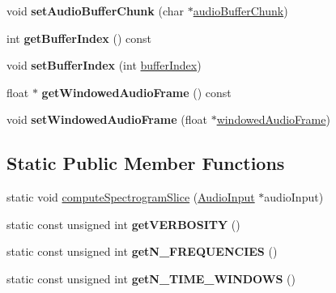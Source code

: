\begin{DoxyCompactItemize}
\hypertarget{classAudioInput_a2534ecbcf1513408cabf8d85c8c8dc46}{}\label{classAudioInput_a2534ecbcf1513408cabf8d85c8c8dc46} 
void {\bfseries set\+Audio\+Buffer\+Chunk} (char $\ast$\hyperlink{classAudioInput_ab1f2b0fc5ee061ab92c045d2325c8ab7}{audio\+Buffer\+Chunk})
\item 
\hypertarget{classAudioInput_a78df439ada22ba00be19c4c8a82bbe3d}{}\label{classAudioInput_a78df439ada22ba00be19c4c8a82bbe3d} 
int {\bfseries get\+Buffer\+Index} () const
\item 
\hypertarget{classAudioInput_a506d7f5eec641d0232286ea145270038}{}\label{classAudioInput_a506d7f5eec641d0232286ea145270038} 
void {\bfseries set\+Buffer\+Index} (int \hyperlink{classAudioInput_a3c9888a90ca8bc6b42257f3f11ee9a6e}{buffer\+Index})
\item 
\hypertarget{classAudioInput_a4de4a846fe48603932495acaafc54449}{}\label{classAudioInput_a4de4a846fe48603932495acaafc54449} 
float $\ast$ {\bfseries get\+Windowed\+Audio\+Frame} () const
\item 
\hypertarget{classAudioInput_a8e7dd67ab635c3935bd54f72a5282dce}{}\label{classAudioInput_a8e7dd67ab635c3935bd54f72a5282dce} 
void {\bfseries set\+Windowed\+Audio\+Frame} (float $\ast$\hyperlink{classAudioInput_ae5a196a9ba111b7aa1ef64db6f092432}{windowed\+Audio\+Frame})
\end{DoxyCompactItemize}
\subsection*{Static Public Member Functions}
\begin{DoxyCompactItemize}
\item 
static void \hyperlink{classAudioInput_a77614769e39be88bbf5d78adf84d9260}{compute\+Spectrogram\+Slice} (\hyperlink{classAudioInput}{Audio\+Input} $\ast$audio\+Input)
\item 
\hypertarget{classAudioInput_a76a26e018987d0a303a32852ebf85254}{}\label{classAudioInput_a76a26e018987d0a303a32852ebf85254} 
static const unsigned int {\bfseries get\+V\+E\+R\+B\+O\+S\+I\+TY} ()
\item 
\hypertarget{classAudioInput_ae73b1fc55b3247b431d27bb673318dde}{}\label{classAudioInput_ae73b1fc55b3247b431d27bb673318dde} 
static const unsigned int {\bfseries get\+N\+\_\+\+F\+R\+E\+Q\+U\+E\+N\+C\+I\+ES} ()
\item 
\hypertarget{classAudioInput_a6e33130e47360bad95cfeb094f079334}{}\label{classAudioInput_a6e33130e47360bad95cfeb094f079334} 
static const unsigned int {\bfseries get\+N\+\_\+\+T\+I\+M\+E\+\_\+\+W\+I\+N\+D\+O\+WS} ()
\end{DoxyCompactItemize}
